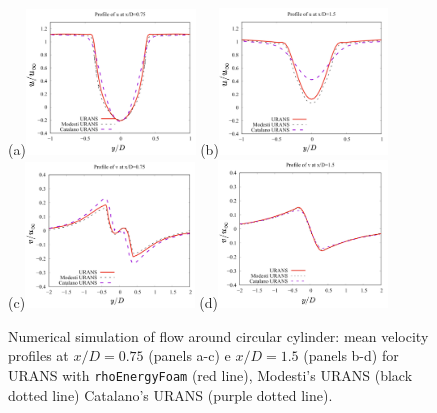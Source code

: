 \documentclass[a5paper]{sapthesis}
\begin{document}
	\begin{figure}[h]
		\centering
		(a){\includegraphics[width=0.4\textwidth]{Figures/Cylinder_u_075}}
		(b){\includegraphics[width=0.4\textwidth]{Figures/Cylinder_u_150}}\\
		(c){\includegraphics[width=0.4\textwidth]{Figures/Cylinder_v_075}}
		(d){\includegraphics[width=0.4\textwidth]{Figures/Cylinder_v_150}}
		\caption[Velocity profiles of a URANS for a flow around cylinder]{Numerical simulation of ﬂow around circular cylinder: mean velocity proﬁles at $x/D = 0.75$ (panels a-c) e $x/D = 1.5$ (panels b-d) for URANS with \texttt{rhoEnergyFoam} (red line), Modesti's URANS (black dotted line) Catalano's URANS (purple dotted line).}
		\label{Cylinder}
	\end{figure}
	
\end{document}
